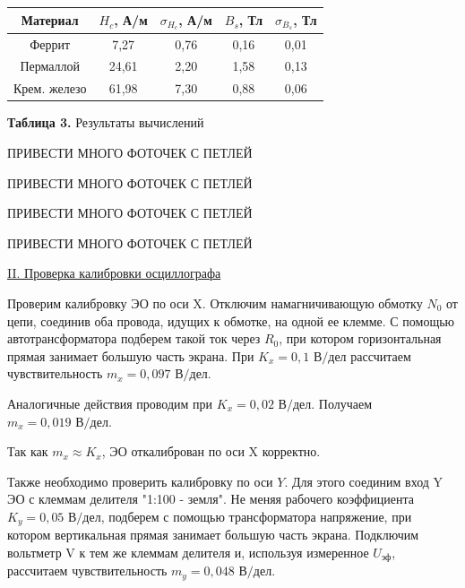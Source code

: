 \documentclass{article}
\begin{document}
\begin{center}
    \begin{tabular}{|c|c|c|c|c|}
		\hline
		Материал     & $H_c$, А/м & $\sigma_{H_c}$, А/м & $B_s$, Тл & $\sigma_{B_s}$, Тл \\ \hline
		Феррит       & 7,27       & 0,76                & 0,16      & 0,01               \\ \hline
		Пермаллой    & 24,61      & 2,20                & 1,58      & 0,13               \\ \hline
		Крем. железо & 61,98      & 7,30                & 0,88      & 0,06               \\ \hline
	\end{tabular}
	
	\textbf{Таблица 3.} Результаты вычислений
\end{center}

\begin{center}
    \LARGE{ПРИВЕСТИ МНОГО ФОТОЧЕК С ПЕТЛЕЙ}
    
    \LARGE{ПРИВЕСТИ МНОГО ФОТОЧЕК С ПЕТЛЕЙ}
    
    \LARGE{ПРИВЕСТИ МНОГО ФОТОЧЕК С ПЕТЛЕЙ}
    
    \LARGE{ПРИВЕСТИ МНОГО ФОТОЧЕК С ПЕТЛЕЙ}
\end{center}

\begin{center}
    \underline{\large {\RN{2}. Проверка калибровки осциллографа}}
\end{center}

Проверим калибровку ЭО по оси X. Отключим намагничивающую обмотку $N_0$ от цепи, соединив оба провода, идущих к обмотке, на одной ее клемме. С помощью автотрансформатора подберем такой ток через $R_0$, при котором горизонтальная прямая занимает большую часть экрана. При $ K_x=0,1 \text{ В/дел} $ рассчитаем чувствительность $m_x=0,097 \text{ В/дел}$.

Аналогичные действия проводим при $ K_x =0,02 \text{ В/дел} $. Получаем $ m_x=0,019 \text{ В/дел} $.

Так как $m_x \approx K_x$, ЭО откалиброван по оси X корректно.

Также необходимо проверить калибровку по оси $ Y $. Для этого соединим вход Y ЭО с клеммам делителя "1:100 - земля". Не меняя рабочего коэффициента $K_y = 0,05\text{ В/дел}$, подберем с помощью трансформатора напряжение, при котором вертикальная прямая занимает большую часть экрана. Подключим вольтметр V к тем же клеммам делителя и, используя измеренное $U_{\text{эф}}$, рассчитаем чувствительность $m_y=0,048\text{ В/дел}$.
\end{document}
